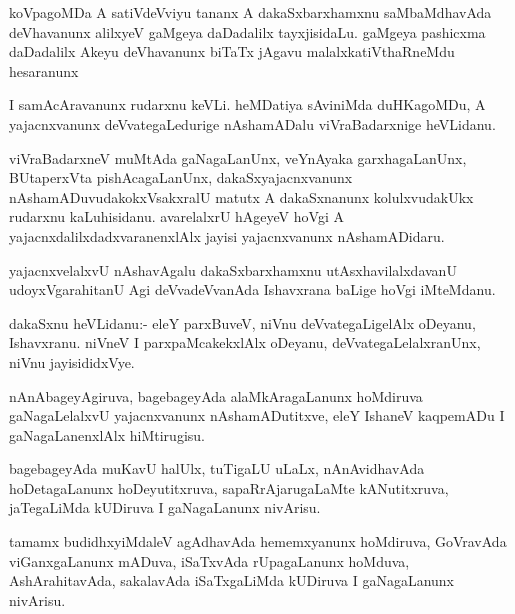 \documentclass{article}
\begin{document}
\begin{mn}
koVpagoMDa A satiVdeVviyu tananx A dakaSxbarxhamxnu saMbaMdhavAda
deVhavanunx alilxyeV gaMgeya daDadalilx tayxjisidaLu. gaMgeya
pashicxma daDadalilx Akeyu deVhavanunx biTaTx jAgavu
malalxkatiVthaRneMdu hesaranunx
\end{mn}

\begin{mn}
I samAcAravanunx rudarxnu keVLi. heMDatiya sAviniMda duHKagoMDu, A
yajacnxvanunx deVvategaLedurige nAshamADalu viVraBadarxnige heVLidanu.
\end{mn}

\begin{mn}%
viVraBadarxneV muMtAda gaNagaLanUnx, veYnAyaka garxhagaLanUnx,
BUtaperxVta pishAcagaLanUnx, dakaSxyajacnxvanunx
nAshamADuvudakokxVsakxralU matutx A dakaSxnanunx kolulxvudakUkx
rudarxnu kaLuhisidanu. avarelalxrU hAgeyeV hoVgi A
yajacnxdalilxdadxvaranenxlAlx jayisi yajacnxvanunx nAshamADidaru.
\end{mn}

\begin{mn}
yajacnxvelalxvU nAshavAgalu dakaSxbarxhamxnu utAsxhavilalxdavanU
udoyxVgarahitanU Agi deVvadeVvanAda Ishavxrana baLige hoVgi iMteMdanu.
\end{mn}

\begin{mn}
dakaSxnu heVLidanu:- eleY parxBuveV, niVnu deVvategaLigelAlx oDeyanu,
Ishavxranu. niVneV I parxpaMcakekxlAlx oDeyanu, deVvategaLelalxranUnx,
niVnu jayisididxVye.
\end{mn}

\begin{mn}%
nAnAbageyAgiruva, bagebageyAda alaMkAragaLanunx hoMdiruva
gaNagaLelalxvU yajacnxvanunx nAshamADutitxve, eleY IshaneV kaqpemADu I
gaNagaLanenxlAlx hiMtirugisu.
\end{mn}

\begin{mn}
bagebageyAda muKavU halUlx, tuTigaLU uLaLx, nAnAvidhavAda
hoDetagaLanunx hoDeyutitxruva, sapaRrAjarugaLaMte kANutitxruva,
jaTegaLiMda kUDiruva I gaNagaLanunx nivArisu.
\end{mn}

\begin{mn}
tamamx budidhxyiMdaleV agAdhavAda hememxyanunx hoMdiruva, GoVravAda
viGanxgaLanunx mADuva, iSaTxvAda rUpagaLanunx hoMduva, AshArahitavAda,
sakalavAda iSaTxgaLiMda kUDiruva I gaNagaLanunx nivArisu.
\end{mn}
\end{document}
